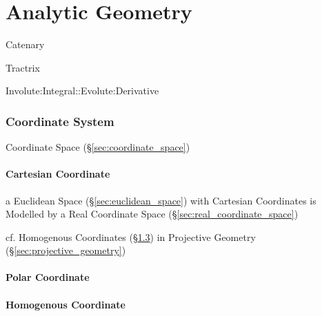 \part{Analytic Geometry}\label{sec:analytic_geometry}

Catenary

Tractrix

Involute:Integral::Evolute:Derivative



\section{Coordinate System}\label{sec:coordinate_system}

Coordinate Space (\S\ref{sec:coordinate_space})



\subsection{Cartesian Coordinate}\label{sec:cartesian_coordinate}

a Euclidean Space (\S\ref{sec:euclidean_space}) with Cartesian
Coordinates is Modelled by a Real Coordinate Space
(\S\ref{sec:real_coordinate_space})

cf. Homogenous Coordinates (\S\ref{sec:homogenous_coordinate}) in
Projective Geometry (\S\ref{sec:projective_geometry})



\subsection{Polar Coordinate}\label{sec:polar_coordinate}

\subsection{Homogenous Coordinate}\label{sec:homogenous_coordinate}

